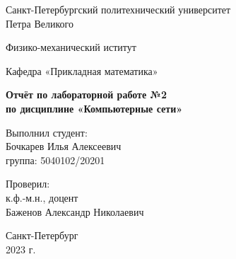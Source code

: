 \begin{titlepage}
	\begin{center}
		{\large Санкт-Петербургский политехнический университет\\Петра Великого\\}
	\end{center}
	
	\begin{center}
		{\large Физико-механический иститут}
	\end{center}
	
	
	\begin{center}
		{\large Кафедра «Прикладная математика»}
	\end{center}
	
	\vspace{8em}
	
	\begin{center}
		{\bfseries Отчёт по лабораторной работе №2 \\по дисциплине «Компьютерные сети»}
	\end{center}
	
	\vspace{5em}
	
	\begin{flushleft}
		\hspace{16em}Выполнил студент:\\\hspace{16em}Бочкарев Илья Алексеевич\\\hspace{16em}группа: 5040102/20201
		
		\vspace{2em}
		
		\hspace{16em}Проверил:\\\hspace{16em}к.ф.-м.н., доцент\\\hspace{16em}Баженов Александр Николаевич
		
	\end{flushleft}
	
	
	\vspace{6em}
	
	
	\begin{center}
		Санкт-Петербург\\2023 г.
	\end{center}	
	
\end{titlepage}